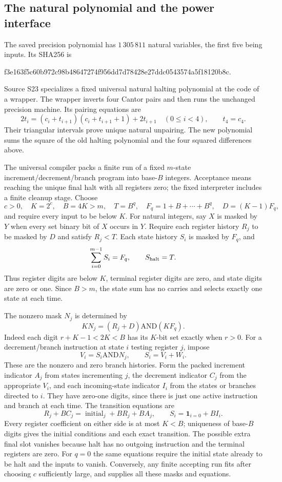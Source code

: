 \subsection{The natural polynomial and the power interface}
The saved precision polynomial has $1\,305\,811$ natural variables,
the first five being inputs. Its SHA256 is
\begin{center}\small\ttfamily
f3e163f5c60b972c98b48647274f956dd7d78428e27ddc0543574a5f18120b8c.
\end{center}
Source S23 specializes a fixed universal natural halting polynomial at
the code of a wrapper. The wrapper inverts four Cantor pairs and then
runs the unchanged precision machine. Its pairing equations are
\[
 2t_i=(c_i+t_{i+1})(c_i+t_{i+1}+1)+2t_{i+1}\quad(0\le i<4),
 \qquad t_4=c_4.
\]
Their triangular intervals prove unique natural unpairing. The new
polynomial sums the square of the old halting polynomial and the four
squared differences above.

The universal compiler packs a finite run of a fixed $m$-state
increment/decrement/branch program into base-$B$ integers. Acceptance
means reaching the unique final halt with all registers zero; the fixed
interpreter includes a finite cleanup stage. Choose
\[
 c>0,\quad K=2^c,\quad B=4K>m,\quad T=B^q,\quad
 F_q=1+B+\cdots+B^q,\quad D=(K-1)F_q,
\]
and require every input to be below $K$. For natural integers, say
$X$ is masked by $Y$ when every set binary bit of $X$ occurs in $Y$.
Require each register history $R_j$ to be masked by $D$ and satisfy
$R_j<T$. Each state history $S_i$ is masked by $F_q$, and
\[
 \sum_{i=0}^{m-1}S_i=F_q,\qquad S_{\rm halt}=T.
\]
Thus register digits are below $K$, terminal register digits are zero,
and state digits are zero or one. Since $B>m$, the state sum has no
carries and selects exactly one state at each time.

The nonzero mask $N_j$ is determined by
\[
 K N_j=(R_j+D)\mathbin{\mathrm{AND}}(K F_q).
\]
Indeed each digit $r+K-1<2K<B$ has its $K$-bit set exactly when
$r>0$. For a decrement/branch instruction at state $i$ testing
register $j$, impose
\[
 V_i=S_i\mathbin{\mathrm{AND}}N_j,\qquad S_i=V_i+W_i.
\]
These are the nonzero and zero branch histories. Form the packed
increment indicator $A_j$ from states incrementing $j$, the decrement
indicator $C_j$ from the appropriate $V_i$, and each incoming-state
indicator $I_i$ from the states or branches directed to $i$.
They have zero-one digits, since there is just one active instruction
and branch at each time. The transition equations are
\[
 R_j+BC_j=\operatorname{initial}_j+BR_j+BA_j,\qquad
 S_i=\mathbf1_{i=0}+BI_i.
\]
Every register coefficient on either side is at most $K<B$;
uniqueness of base-$B$ digits gives the initial conditions and each
exact transition. The possible extra final slot vanishes because
halt has no outgoing instruction and the terminal registers are zero.
For $q=0$ the same equations require the initial state already to be
halt and the inputs to vanish. Conversely, any finite accepting run
fits after choosing $c$ sufficiently large, and supplies all these
masks and equations.

